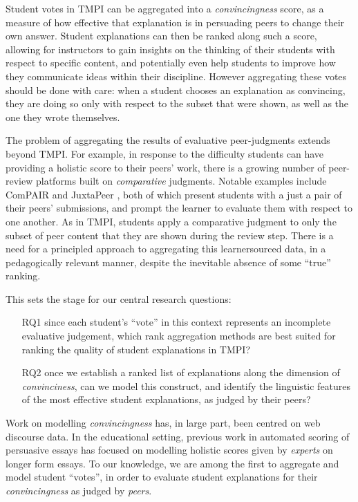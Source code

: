 \documentclass[notitlepage,12pt]{jedm}
\begin{document}
Student votes in TMPI can be aggregated into a \textit{convincingness} score, 
as a measure of how effective that explanation is in persuading peers to change 
their own answer.
Student explanations can then be ranked along such a score, allowing for 
instructors to gain insights on the thinking of their students with respect to 
specific content, and potentially even help students to improve how they 
communicate ideas within their discipline.
However aggregating these votes should be done with care: when a student 
chooses an explanation as convincing, they are doing so only with respect to 
the subset that were shown, as well as the one they wrote themselves.

The problem of aggregating the results of evaluative peer-judgments extends  
beyond TMPI.
For example, in response to the difficulty students can have providing a 
holistic score to their peers' work, there is a growing number of peer-review 
platforms built on \textit{comparative} judgments.
Notable examples include ComPAIR \cite{potter_compair:_2017} and 
JuxtaPeer \cite{cambre_juxtapeer:_2018}, both of which present students with a 
just a pair of their peers' submissions, and prompt the learner to evaluate 
them with respect to one another.
As in TMPI, students apply a comparative judgment to only the subset of peer 
content that they are shown during the review step.
There is a need for a principled approach to aggregating this learnersourced 
data, in a pedagogically relevant manner, despite the inevitable absence of 
some ``true'' ranking.

This sets the stage for our central research questions: 
\begin{itemize}
	\item[RQ1] since each student's ``vote'' in this context represents an 
	incomplete evaluative judgement, which rank aggregation 
	methods are best suited for ranking the quality of student 
	explanations in TMPI?
	\item[RQ2] once we establish a ranked list of explanations along the 
	dimension of \textit{convinciness}, can we model this construct, and 
	identify the linguistic features of the most effective student 
	explanations, as judged by their peers?
\end{itemize}

Work on modelling \textit{convincingness} has, in large part, been centred on 
web discourse data.
In the educational setting, previous work in automated scoring of persuasive 
essays has focused on modelling holistic scores given by \textit{experts} on 
longer form essays.
To our knowledge, we are among the first to aggregate and model student 
``votes'', in order to evaluate student explanations for their 
\textit{convincingness} as judged by \textit{peers}.
\end{document}
